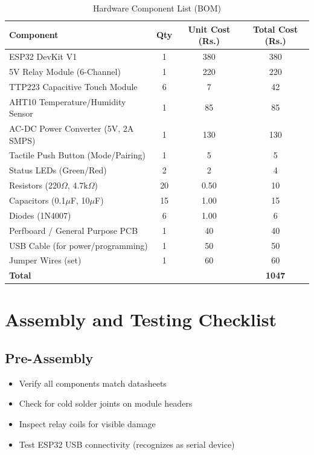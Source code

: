 \begin{table}[H]
\centering
\caption{Hardware Component List (BOM)}
\label{tbl:bom}
\begin{tabular}{|l|c|c|c|}
\hline
\textbf{Component} & \textbf{Qty} & \textbf{Unit Cost (Rs.)} & \textbf{Total Cost (Rs.)} \\
\hline
ESP32 DevKit V1 & 1 & 380 & 380 \\
\hline
5V Relay Module (6-Channel) & 1 & 220 & 220 \\
\hline
TTP223 Capacitive Touch Module & 6 & 7 & 42 \\
\hline
AHT10 Temperature/Humidity Sensor & 1 & 85 & 85 \\
\hline
AC-DC Power Converter (5V, 2A SMPS) & 1 & 130 & 130 \\
\hline
Tactile Push Button (Mode/Pairing) & 1 & 5 & 5 \\
\hline
Status LEDs (Green/Red) & 2 & 2 & 4 \\
\hline
Resistors (220\(\Omega\), 4.7k\(\Omega\)) & 20 & 0.50 & 10 \\
\hline
Capacitors (0.1\(\mu\)F, 10\(\mu\)F) & 15 & 1.00 & 15 \\
\hline
Diodes (1N4007) & 6 & 1.00 & 6 \\
\hline
Perfboard / General Purpose PCB & 1 & 40 & 40 \\
\hline
USB Cable (for power/programming) & 1 & 50 & 50 \\
\hline
Jumper Wires (set) & 1 & 60 & 60 \\
\hline
\textbf{Total} &  &  & \textbf{1047} \\
\hline
\end{tabular}
\end{table}

\section{Assembly and Testing Checklist}

\subsection{Pre-Assembly}

\begin{itemize}
    \item [ ] Verify all components match datasheets
    \item [ ] Check for cold solder joints on module headers
    \item [ ] Inspect relay coils for visible damage
    \item [ ] Test ESP32 USB connectivity (recognizes as serial device)
\end{itemize}

